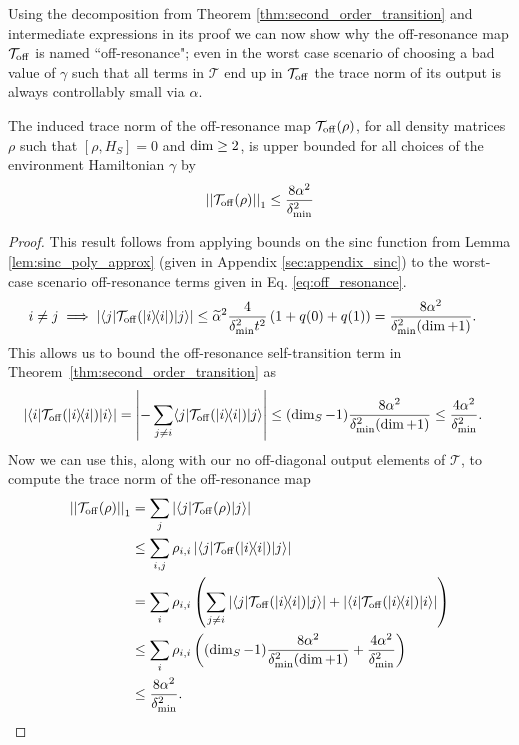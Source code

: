 Using the decomposition from Theorem \ref{thm:second_order_transition} and intermediate expressions in its proof we can now show why the off-resonance map $\mathcal{T}_{\rm off}$ is named ``off-resonance"; even in the worst case scenario of choosing a bad value of $\gamma$ such that all terms in $\mathcal{T}$ end up in $\mathcal{T}_{\rm off}$ the trace norm of its output is always controllably small via $\alpha$.
\begin{corollary} \label{cor:t_off_norm}
    The induced trace norm of the off-resonance map $\mathcal{T}_{\rm off}(\rho)$, for all density matrices $\rho$ such that $[\rho, H_S] = 0$ and $\rm{dim}\ge 2$, is upper bounded for all choices of the environment Hamiltonian $\gamma$ by
    \begin{align}
        \left| \left| \mathcal{T}_{\rm off}(\rho) \right| \right|_1 \le \frac{8 \alpha^2}{\delta_{\min}^2}
    \end{align}
\end{corollary}
\begin{proof}

This result follows from applying bounds on the sinc function from Lemma \ref{lem:sinc_poly_approx} (given in Appendix \ref{sec:appendix_sinc}) to the worst-case scenario off-resonance terms given in Eq. \eqref{eq:off_resonance}. 
    \begin{align}
        i \neq j \implies \left| \langle j|\mathcal{T}_{\rm off}(| i\rangle\! \langle i|)|j\rangle \right| &\le \widetilde{\alpha}^2\frac{4}{\delta_{\min}^2 t^2} \left( 1 + q(0) + q(1)\right) = \frac{8 \alpha^2}{\delta_{\min}^2(\dim + 1)}.
    \end{align}
    This allows us to bound the off-resonance self-transition term in Theorem~\ref{thm:second_order_transition} as
    \begin{align}
        \left| \langle i|\mathcal{T}_{\rm off}(| i\rangle\! \langle i|)|i\rangle \right| &= \left| - \sum_{j \neq i} \langle j| \mathcal{T}_{\rm off}(| i\rangle\! \langle i|) |j\rangle \right| \le (\dim_S - 1) \frac{8 \alpha^2}{\delta_{\min}^2 (\dim + 1)} \le \frac{4 \alpha^2}{\delta_{\min}^2}.
    \end{align}
    Now we can use this, along with our no off-diagonal output elements of $\mathcal{T}$, to compute the trace norm of the off-resonance map
    \begin{align}
        \left| \left| \mathcal{T}_{\rm off}(\rho) \right| \right|_1 &= \sum_{j} \left| \langle j| \mathcal{T}_{\rm off}(\rho) |j\rangle \right| \\
        &\le \sum_{i, j} \rho_{i,i} \left| \langle j|\mathcal{T}_{\rm off}(| i\rangle\! \langle i|)|j\rangle \right| \\
        &= \sum_{i} \rho_{i,i} \left(\sum_{j \neq i} |\langle j| \mathcal{T}_{\rm off}(| i\rangle\! \langle i|) |j\rangle| + |\langle i| \mathcal{T}_{\rm off}(| i\rangle\! \langle i|)|i\rangle| \right) \\
        &\le \sum_{i} \rho_{i,i} \left( (\dim_S - 1) \frac{8 \alpha^2}{\delta_{\min}^2(\dim + 1)} + \frac{4 \alpha^2}{\delta_{\min}^2} \right) \\
        &\le \frac{8 \alpha^2}{\delta_{\min}^2}.
    \end{align}
\end{proof}

